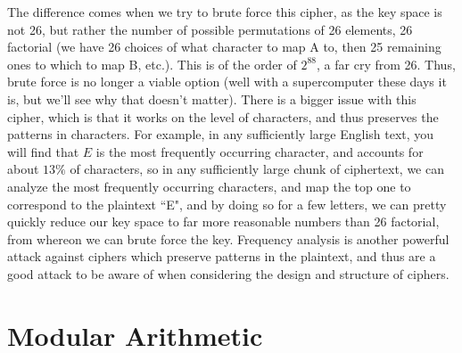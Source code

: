 \documentclass{article}
\begin{document}
\noindent The difference comes when we try to brute force this cipher, as the key space is not 26, but rather the number of possible permutations of 26 elements, 26 factorial (we have 26 choices of what character to map A to, then 25 remaining ones to which to map B, etc.). This is of the order of $2^{88}$, a far cry from 26. Thus, brute force is no longer a viable option (well with a supercomputer these days it is, but we'll see why that doesn't matter). There is a bigger issue with this cipher, which is that it works on the level of characters, and thus preserves the patterns in characters. For example, in any sufficiently large English text, you will find that $E$ is the most frequently occurring character, and accounts for about $13\%$ of characters, so in any sufficiently large chunk of ciphertext, we can analyze the most frequently occurring characters, and map the top one to correspond to the plaintext ``E", and by doing so for a few letters, we can pretty quickly reduce our key space to far more reasonable numbers than 26 factorial, from whereon we can brute force the key. Frequency analysis is another powerful attack against ciphers which preserve patterns in the plaintext, and thus are a good attack to be aware of when considering the design and structure of ciphers.



\section{Modular Arithmetic}
\end{document}
